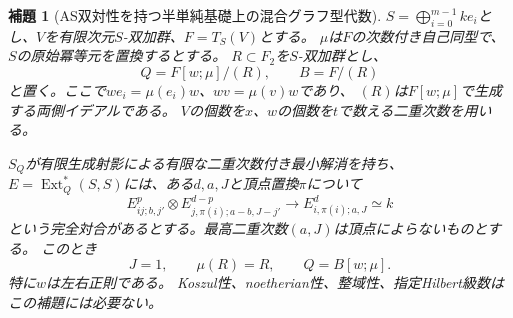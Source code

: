 \documentclass[11pt,a4paper]{ltjsarticle}
\newtheorem{lemma}[theorem]{補題}
\theoremstyle{definition}
\begin{document}
\begin{lemma}[AS双対性を持つ半単純基礎上の混合グラフ型代数]
\label{igraph:lem:as-graph-ore}
$S=\bigoplus_{i=0}^{m-1}ke_i$とし、$V$を有限次元$S$-双加群、$F=T_S(V)$とする。
$\mu$は$F$の次数付き自己同型で、$S$の原始冪等元を置換するとする。
$R\subset F_2$を$S$-双加群とし、
\[
Q=F[w;\mu]/(R),\qquad B=F/(R)
\]
と置く。ここで$w e_i=\mu(e_i)w$、$wv=\mu(v)w$であり、
$(R)$は$F[w;\mu]$で生成する両側イデアルである。
$V$の個数を$x$、$w$の個数を$t$で数える二重次数を用いる。

$S_Q$が有限生成射影による有限な二重次数付き最小解消を持ち、
$E=\operatorname{Ext}_Q^*(S,S)$には、ある$d,a,J$と頂点置換$\pi$について
\[
E^p_{ij;b,j'}\otimes
E^{d-p}_{j,\pi(i);a-b,J-j'}\longrightarrow
E^d_{i,\pi(i);a,J}\simeq k
\]
という完全対合があるとする。最高二重次数$(a,J)$は頂点によらないものとする。
このとき
\[
J=1,\qquad \mu(R)=R,\qquad Q=B[w;\mu].
\]
特に$w$は左右正則である。
Koszul性、noetherian性、整域性、指定Hilbert級数はこの補題には必要ない。
\end{lemma}
\end{document}
